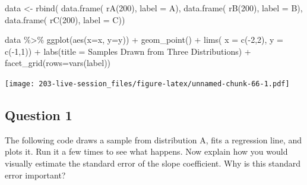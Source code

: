\documentclass[
]{book}
\newenvironment{Shaded}{\begin{snugshade}}{\end{snugshade}}
\newcommand{\AttributeTok}[1]{\textcolor[rgb]{0.77,0.63,0.00}{#1}}
\newcommand{\DecValTok}[1]{\textcolor[rgb]{0.00,0.00,0.81}{#1}}
\newcommand{\FunctionTok}[1]{\textcolor[rgb]{0.00,0.00,0.00}{#1}}
\newcommand{\NormalTok}[1]{#1}
\newcommand{\OtherTok}[1]{\textcolor[rgb]{0.56,0.35,0.01}{#1}}
\newcommand{\SpecialCharTok}[1]{\textcolor[rgb]{0.00,0.00,0.00}{#1}}
\newcommand{\StringTok}[1]{\textcolor[rgb]{0.31,0.60,0.02}{#1}}
\theoremstyle{definition}
\theoremstyle{definition}
\theoremstyle{definition}
\theoremstyle{definition}
\theoremstyle{remark}
\begin{document}
\begin{Shaded}
\begin{Highlighting}[]
\NormalTok{data }\OtherTok{\textless{}{-}} \FunctionTok{rbind}\NormalTok{( }
  \FunctionTok{data.frame}\NormalTok{( }\FunctionTok{rA}\NormalTok{(}\DecValTok{200}\NormalTok{), }\AttributeTok{label =} \StringTok{\textquotesingle{}A\textquotesingle{}}\NormalTok{),}
  \FunctionTok{data.frame}\NormalTok{( }\FunctionTok{rB}\NormalTok{(}\DecValTok{200}\NormalTok{), }\AttributeTok{label =} \StringTok{\textquotesingle{}B\textquotesingle{}}\NormalTok{),}
  \FunctionTok{data.frame}\NormalTok{( }\FunctionTok{rC}\NormalTok{(}\DecValTok{200}\NormalTok{), }\AttributeTok{label =} \StringTok{\textquotesingle{}C\textquotesingle{}}\NormalTok{))}
\end{Highlighting}
\end{Shaded}

\begin{Shaded}
\begin{Highlighting}[]
\NormalTok{data }\SpecialCharTok{\%\textgreater{}\%} 
  \FunctionTok{ggplot}\NormalTok{(}\FunctionTok{aes}\NormalTok{(}\AttributeTok{x=}\NormalTok{x, }\AttributeTok{y=}\NormalTok{y)) }\SpecialCharTok{+} 
  \FunctionTok{geom\_point}\NormalTok{() }\SpecialCharTok{+} 
  \FunctionTok{lims}\NormalTok{(}
    \AttributeTok{x =} \FunctionTok{c}\NormalTok{(}\SpecialCharTok{{-}}\DecValTok{2}\NormalTok{,}\DecValTok{2}\NormalTok{), }
    \AttributeTok{y =} \FunctionTok{c}\NormalTok{(}\SpecialCharTok{{-}}\DecValTok{1}\NormalTok{,}\DecValTok{1}\NormalTok{)) }\SpecialCharTok{+} 
  \FunctionTok{labs}\NormalTok{(}\AttributeTok{title =} \StringTok{\textquotesingle{}Samples Drawn from Three Distributions\textquotesingle{}}\NormalTok{) }\SpecialCharTok{+} 
  \FunctionTok{facet\_grid}\NormalTok{(}\AttributeTok{rows=}\FunctionTok{vars}\NormalTok{(label))}
\end{Highlighting}
\end{Shaded}

\texttt{[image: 203-live-session\_files/figure-latex/unnamed-chunk-66-1.pdf]}

\hypertarget{question-1}{%
\subsection{Question 1}\label{question-1}}

The following code draws a sample from distribution A, fits a regression line, and plots it. Run it a few times to see what happens. Now explain how you would visually estimate the standard error of the slope coefficient. Why is this standard error important?
\end{document}
